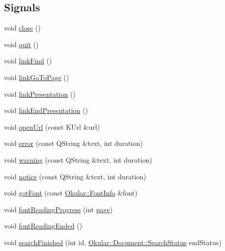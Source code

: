 \subsection*{Signals}
\begin{DoxyCompactItemize}
\item 
void \hyperlink{classOkular_1_1Document_a703b5ba4788bacfc7ab9b49e479eb07f}{close} ()
\item 
void \hyperlink{classOkular_1_1Document_aa04cd4b2c38ee3fbf65d2b3b567e23a2}{quit} ()
\item 
void \hyperlink{classOkular_1_1Document_a5fc2584f750c347596ca9b8f8b94338c}{link\+Find} ()
\item 
void \hyperlink{classOkular_1_1Document_a400ff9bcef27418b96a7dd3cdd0f5ec0}{link\+Go\+To\+Page} ()
\item 
void \hyperlink{classOkular_1_1Document_a508d62333a719a476c280d7336550009}{link\+Presentation} ()
\item 
void \hyperlink{classOkular_1_1Document_a191d6d17e084e1c10d8278963420ef6d}{link\+End\+Presentation} ()
\item 
void \hyperlink{classOkular_1_1Document_a02ced6263d4d216ba2e38d8ab9cc96b7}{open\+Url} (const K\+Url \&url)
\item 
void \hyperlink{classOkular_1_1Document_a0f6dbe3d679e96b2b91f9b467d12d251}{error} (const Q\+String \&text, int duration)
\item 
void \hyperlink{classOkular_1_1Document_ab58767168ff4cccd54e91c53c033b362}{warning} (const Q\+String \&text, int duration)
\item 
void \hyperlink{classOkular_1_1Document_a873400e880e01d6ccf99bfce18dd0e26}{notice} (const Q\+String \&text, int duration)
\item 
void \hyperlink{classOkular_1_1Document_a66902f0fbc6c9068568f8a1eb923583d}{got\+Font} (const \hyperlink{classOkular_1_1FontInfo}{Okular\+::\+Font\+Info} \&font)
\item 
void \hyperlink{classOkular_1_1Document_aa264e97a1d3dd36aab35fd3a09511b5b}{font\+Reading\+Progress} (int \hyperlink{classOkular_1_1Document_a1c95c2f192d739c217d00971da48f69d}{page})
\item 
void \hyperlink{classOkular_1_1Document_a098247701022e6c967299abd01ce3265}{font\+Reading\+Ended} ()
\item 
void \hyperlink{classOkular_1_1Document_ae938c994d20bdfef40caa3d37d28d92d}{search\+Finished} (int id, \hyperlink{classOkular_1_1Document_aa9c2934f6abce7b0440ec74bb56eefbb}{Okular\+::\+Document\+::\+Search\+Status} end\+Status)

\end{DoxyCompactItemize}
